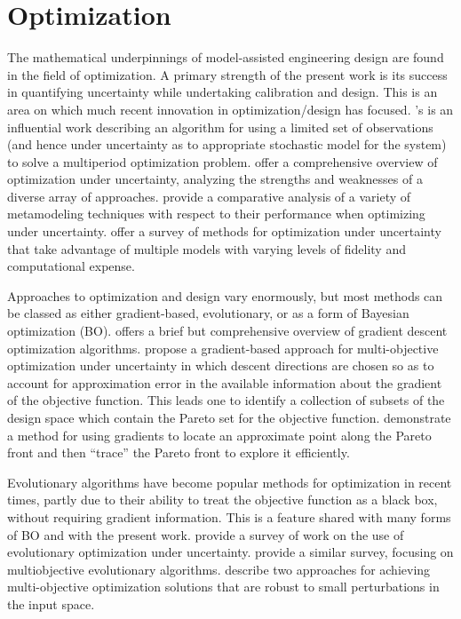 \documentclass[10pt,a4paper]{article}
\begin{document}
\section{Optimization}

The mathematical underpinnings of model-assisted engineering design are found in the field of optimization.
A primary strength of the present work is its success in quantifying uncertainty while undertaking calibration and design.
This is an area on which much recent innovation in optimization/design has focused.
\citeauthor{Rockafellar1991}'s \citeyearpar{Rockafellar1991} is an influential work describing an algorithm for using a limited set of observations (and hence under uncertainty as to appropriate stochastic model for the system) to solve a multiperiod optimization problem.
\citet{Sahinidis2004} offer a comprehensive overview of optimization under uncertainty, analyzing the strengths and weaknesses of a diverse array of approaches.
\citet{Jin2003} provide a comparative analysis of a variety of metamodeling techniques with respect to their performance when optimizing under uncertainty.
\citet{Peherstorfer2018} offer a survey of methods for optimization under uncertainty that take advantage of multiple models with varying levels of fidelity and computational expense.

Approaches to optimization and design vary enormously, but most methods can be classed as either gradient-based, evolutionary, or as a form of Bayesian optimization (BO).
\citet{Ruder2016} offers a brief but comprehensive overview of gradient descent optimization algorithms.
\citet{Peitz2018} propose a gradient-based approach for multi-objective optimization under uncertainty in which descent directions are chosen so as to account for approximation error in the available information about the gradient of the objective function.
This leads one to identify a collection of subsets of the design space which contain the Pareto set for the objective function.
\citet{Vasilopoulos2019} demonstrate a method for using gradients to locate an approximate point along the Pareto front and then ``trace'' the Pareto front to explore it efficiently.

Evolutionary algorithms have become popular methods for optimization in recent times, partly due to their ability to treat the objective function as a black box, without requiring gradient information.
This is a feature shared with many forms of BO and with the present work.
\citet{Jin2003} provide a survey of work on the use of evolutionary optimization under uncertainty.
\citet{Zhou2011b} provide a similar survey, focusing on multiobjective evolutionary algorithms.
\citet{Deb2006} describe two approaches for achieving multi-objective optimization solutions that are robust to small perturbations in the input space.
\end{document}
